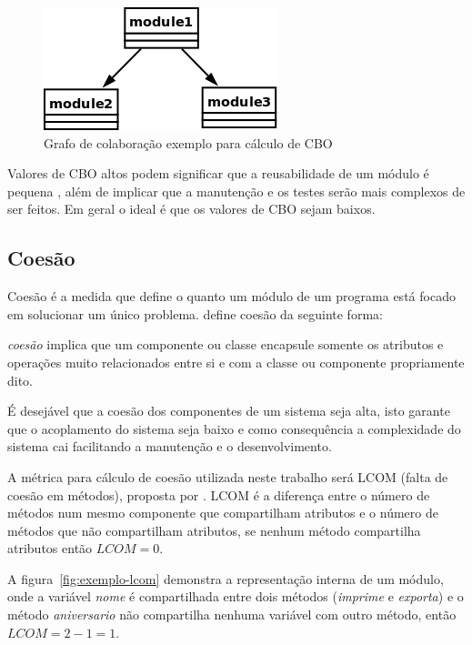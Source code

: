 \begin{figure}[h]
\center
\includegraphics[scale=0.4]{imagens/exemplo-cbo}
\caption{Grafo de colaboração exemplo para cálculo de CBO}
\label{fig:exemplo-cbo}
\end{figure}

Valores de CBO altos podem significar que a reusabilidade de um módulo é
pequena \cite{engenhariaDeSoftwarePressman}, além de implicar que a manutenção
e os testes serão mais complexos de ser feitos. Em geral o ideal é que os
valores de CBO sejam baixos.

\subsection{Coesão}

Coesão é a medida que define o quanto um módulo de um programa está focado em
solucionar um único problema.  define
coesão da seguinte forma:

\begin{citacao}
{\it coesão} implica que um componente ou classe encapsule somente os atributos
e operações muito relacionados entre si e com a classe ou componente
propriamente dito. \cite{engenhariaDeSoftwarePressman}
\end{citacao}

É desejável que a coesão dos componentes de um sistema seja alta, isto garante
que o acoplamento do sistema seja baixo e como consequência a complexidade do
sistema cai facilitando a manutenção e o desenvolvimento. 

A métrica para cálculo de coesão utilizada neste trabalho será LCOM (falta de
coesão em métodos), proposta por . LCOM é a
diferença entre o número de métodos num mesmo componente que compartilham
atributos e o número de métodos que não compartilham atributos, se nenhum
método compartilha atributos então $LCOM = 0$.

A figura~\ref{fig:exemplo-lcom} demonstra a representação interna de um módulo,
onde a variável {\it nome} é compartilhada entre dois métodos ({\it imprime} e
{\it exporta}) e o método {\it aniversario} não compartilha nenhuma variável
com outro método, então $LCOM = 2 - 1 = 1$.

